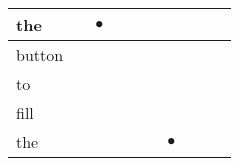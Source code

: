 \documentclass[landscape]{article}
\newcommand{\ssp}{\hspace{2pt}}
\newcommand{\mex}{\cellcolor{g}$\bullet$}
\begin{document}
\begin{tabular}{|l|p{10pt}|p{10pt}|p{10pt}|p{10pt}|p{10pt}|p{10pt}|p{10pt}|p{10pt}|p{10pt}|}
\hline
\ssp \cellcolor{ref1}the \ssp&\hspace{2pt}&\hspace{2pt}\mex&\hspace{2pt}&\hspace{2pt}&\hspace{2pt}&\hspace{2pt}&\hspace{2pt}&\hspace{2pt}&\hspace{2pt}\\
\hline
\ssp button \ssp&\hspace{2pt}&\hspace{2pt}&\hspace{2pt}&\hspace{2pt}&\hspace{2pt}&\hspace{2pt}&\hspace{2pt}&\hspace{2pt}&\hspace{2pt}\\
\hline
\ssp to \ssp&\hspace{2pt}&\hspace{2pt}&\hspace{2pt}&\hspace{2pt}&\hspace{2pt}&\hspace{2pt}&\hspace{2pt}&\hspace{2pt}&\hspace{2pt}\\
\hline
\ssp fill \ssp&\hspace{2pt}&\hspace{2pt}&\hspace{2pt}&\hspace{2pt}&\hspace{2pt}&\hspace{2pt}&\hspace{2pt}&\hspace{2pt}&\hspace{2pt}\\
\hline
\ssp \cellcolor{ref5}the \ssp&\hspace{2pt}&\hspace{2pt}&\hspace{2pt}&\hspace{2pt}&\hspace{2pt}&\hspace{2pt}\mex&\hspace{2pt}&\hspace{2pt}&\hspace{2pt}\\

\end{tabular}
\end{document}
